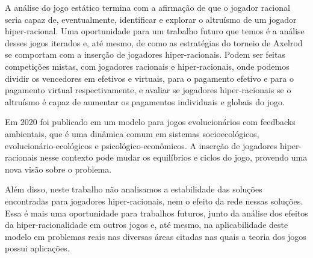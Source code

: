 A análise do jogo estático termina com a afirmação de que o jogador racional seria capaz de, eventualmente, identificar e explorar o altruísmo de um jogador hiper-racional. Uma oportunidade para um trabalho futuro que temos é a análise desses jogos iterados e, até mesmo, de como as estratégias do torneio de Axelrod se comportam com a inserção de jogadores hiper-racionais. Podem ser feitas competições mistas, com jogadores racionais e hiper-racionais, onde podemos dividir os vencedores em efetivos e virtuais, para o pagamento efetivo e para o pagamento virtual respectivamente, e avaliar se jogadores hiper-racionais se o altruísmo é capaz de aumentar os pagamentos individuais e globais do jogo.

Em 2020 foi publicado em \cite{tilman2020evolutionary} um modelo para jogos evolucionários com feedbacks ambientais, que é uma dinâmica comum em sistemas socioecológicos, evolucionário-ecológicos e psicológico-econômicos. A inserção de jogadores hiper-racionais nesse contexto pode mudar os equilíbrios e ciclos do jogo, provendo uma nova visão sobre o problema.

Além disso, neste trabalho não analisamos a estabilidade das soluções encontradas para jogadores hiper-racionais, nem o efeito da rede nessas soluções. Essa é mais uma oportunidade para trabalhos futuros, junto da análise dos efeitos da hiper-racionalidade em outros jogos e, até mesmo, na aplicabilidade deste modelo em problemas reais nas diversas áreas citadas nas quais a teoria dos jogos possui aplicações.
